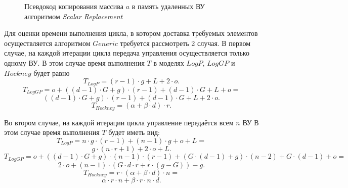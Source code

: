 \begin{figure}[!h]
	
    \caption{Псевдокод копирования массива $a$ в память удаленных ВУ алгоритмом
\textit{Scalar Replacement}}
    \label{list:r_iterations_loop_scalar_replacement}
\end{figure}

Для оценки времени выполнения цикла, в котором доставка требуемых элементов
осуществляется алгоритмом $Generic$ требуется рассмотреть 2 случая.
В первом случае, на каждой итерации цикла передача управления осуществляется
только одному ВУ. В этом случае время выполнения $T$ в моделях $LogP$, $LogGP$
и $Hockney$ будет равно
\[ T_{LogP} = (r - 1) \cdot g + L + 2 \cdot o. \]
\[ T_{LogGP} = o + ((d - 1) \cdot G + g) \cdot (r - 1) + (d - 1) \cdot G + L + o
= \]
\[ ((d - 1) \cdot G + g) \cdot (r - 1) + (d - 1) \cdot G + L + 2 \cdot o.\]
\[ T_{Hockney} = (\alpha + \beta \cdot d) \cdot r.\]

Во втором случае, на каждой итерации цикла управление передаётся всем $n$ ВУ
В этом случае время выполнения $T$ будет иметь вид:
\[ T_{LogP} = n \cdot g \cdot (r - 1) + (n - 1) \cdot g + o + L = \]
\[ g \cdot (n \cdot r + 1) + 2 \cdot o + L. \]
\[ T_{LogGP} = o + ((d - 1) \cdot G + g) \cdot (n - 1) \cdot (r - 1) +
(G \cdot (d -1) + g) \cdot (n - 2) + G \cdot (d - 1) + o = \]
\[ 2 \cdot o + (n - 1) \cdot (G \cdot d \cdot r + r \cdot (g - G)) - g. \]
\[ T_{Hockney} = r \cdot (\alpha + \beta \cdot d) \cdot n =\]
\[ \alpha \cdot r \cdot n + \beta \cdot r \cdot n \cdot d. \]
